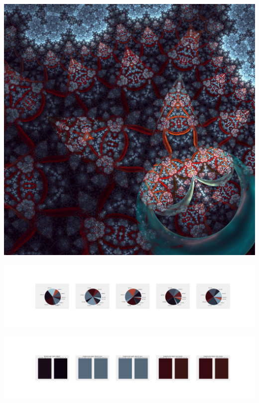 \documentclass[11pt]{article}
\begin{document}
\begin{landscape}
    \begin{center}
    \includegraphics[width=\textwidth]{./nbimg/file (237).jpg}
    \end{center}

    \begin{center}
    \includegraphics[width=250mm]{./nbimg/pie-153.jpg}
    \end{center}

    \begin{center}
    \includegraphics[width=250mm]{./nbimg/peak-153.jpg}
    \end{center}
    


\end{landscape}
\end{document}
